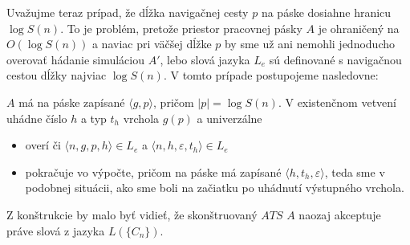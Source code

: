 {\begin{dokaz}
  Uvažujme teraz prípad, že dĺžka navigačnej cesty $p$ na páske
  dosiahne hranicu $\log S(n)$. To je problém, pretože priestor
  pracovnej pásky $A$ je ohraničený na $O(\log S(n))$ a naviac pri
  väčšej dĺžke $p$ by sme už ani nemohli jednoducho overovať hádanie
  simuláciou $A'$, lebo slová jazyka $L_e$ sú definované s
  navigačnou cestou dĺžky najviac $\log S(n)$. V tomto prípade
  postupojeme nasledovne:

  $A$ má na páske zapísané $\langle g,p\rangle $, pričom $|p|=\log
  S(n)$. V existenčnom vetvení uhádne číslo $h$ a typ $t_h$ vrchola
  $g(p)$ a univerzálne
  \begin{itemize}
    \item overí či $\langle n,g,p,h\rangle \in L_e$ a $\langle n,h,\varepsilon,t_h\rangle \in
    L_e$
    \item pokračuje vo výpočte, pričom na páske má zapísané
    $\langle h,t_h,\varepsilon\rangle $, teda sme v podobnej situácii, ako sme
    boli na začiatku po uhádnutí výstupného vrchola.
  \end{itemize}

  Z konštrukcie by malo byť vidieť, že skonštruovaný $ATS$ $A$
  naozaj akceptuje práve slová z jazyka $L(\{ C_n\})$.


\end{dokaz}}
